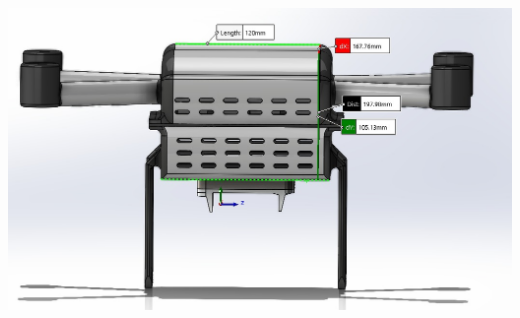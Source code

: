 \documentclass[12pt]{report}
\begin{document}
\hfill %
\begin{minipage}{0.4\textwidth}
    \centering
    \includegraphics[width=\linewidth]{4.jpeg}
\end{minipage}
\end{document}
